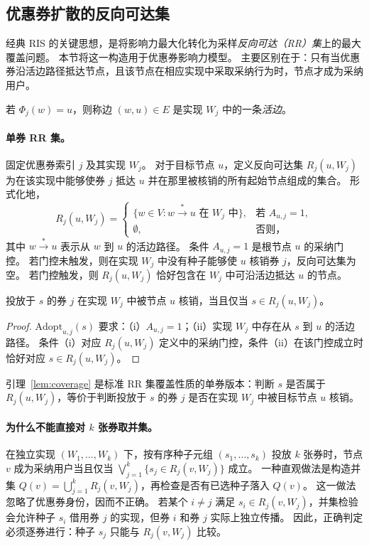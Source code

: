 \documentclass[sigconf,balance=false]{acmart}
\begin{document}
\subsection{优惠券扩散的反向可达集}

经典 RIS 的关键思想，是将影响力最大化转化为采样\emph{反向可达（RR）集}上的最大覆盖问题。
本节将这一构造用于优惠券影响力模型。
主要区别在于：只有当优惠券沿活边路径抵达节点，且该节点在相应实现中采取采纳行为时，节点才成为采纳用户。

\begin{definition}[活边]
若 $\Phi_j(w)=u$，则称边 $(w,u)\in E$ 是实现 $W_j$ 中的一条\emph{活边}。
\end{definition}

\paragraph{单券 RR 集。}
固定优惠券索引 $j$ 及其实现 $W_j$。
对于目标节点 $u$，定义反向可达集 $R_j(u,W_j)$ 为在该实现中能够使券 $j$ 抵达 $u$ 并在那里被核销的所有起始节点组成的集合。
形式化地，
\[
  R_j(u, W_j) =
  \begin{cases}
    \{w \in V : w \xrightarrow{*} u \text{ 在 } W_j\text{ 中}\},
      & \text{若 } A_{u,j} = 1, \\
    \emptyset, & \text{否则，}
  \end{cases}
\]
其中 $w\xrightarrow{*}u$ 表示从 $w$ 到 $u$ 的活边路径。
条件 $A_{u,j}=1$ 是根节点 $u$ 的采纳门控。
若门控未触发，则在实现 $W_j$ 中没有种子能够使 $u$ 核销券 $j$，反向可达集为空。
若门控触发，则 $R_j(u,W_j)$ 恰好包含在 $W_j$ 中可沿活边抵达 $u$ 的节点。

\begin{lemma}[覆盖引理]
\label{lem:coverage}
投放于 $s$ 的券 $j$ 在实现 $W_j$ 中被节点 $u$ 核销，当且仅当 $s\in R_j(u,W_j)$。
\end{lemma}

\begin{proof}
$\mathrm{Adopt}_{u,j}(s)$ 要求：（i）$A_{u,j}=1$；（ii）实现 $W_j$ 中存在从 $s$ 到 $u$ 的活边路径。
条件（i）对应 $R_j(u,W_j)$ 定义中的采纳门控，条件（ii）在该门控成立时恰好对应 $s\in R_j(u,W_j)$。
\end{proof}

引理~\ref{lem:coverage} 是标准 RR 集覆盖性质的单券版本：判断 $s$ 是否属于 $R_j(u,W_j)$，等价于判断投放于 $s$ 的券 $j$ 是否在实现 $W_j$ 中被目标节点 $u$ 核销。

\paragraph{为什么不能直接对 $k$ 张券取并集。}
在独立实现 $(W_1,\ldots,W_k)$ 下，按有序种子元组 $(s_1,\ldots,s_k)$ 投放 $k$ 张券时，节点 $v$ 成为采纳用户当且仅当 $\bigvee_{j=1}^k\{s_j\in R_j(v,W_j)\}$ 成立。
一种直观做法是构造并集 $Q(v)=\bigcup_{j=1}^k R_j(v,W_j)$，再检查是否有已选种子落入 $Q(v)$。
这一做法忽略了优惠券身份，因而不正确。
若某个 $i\neq j$ 满足 $s_i\in R_j(v,W_j)$，并集检验会允许种子 $s_i$ 借用券 $j$ 的实现，但券 $i$ 和券 $j$ 实际上独立传播。
因此，正确判定必须逐券进行：种子 $s_j$ 只能与 $R_j(v,W_j)$ 比较。
\end{document}
